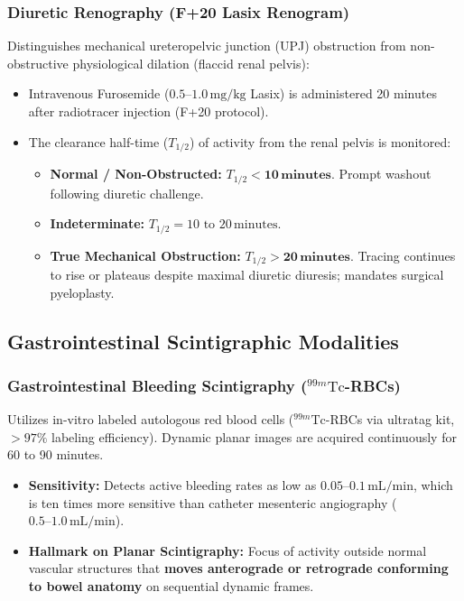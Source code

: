\documentclass[11pt,a4paper]{article}
\begin{document}
\subsubsection{Diuretic Renography (F+20 Lasix Renogram)}
Distinguishes mechanical ureteropelvic junction (UPJ) obstruction from non-obstructive physiological dilation (flaccid renal pelvis):
\begin{itemize}[leftmargin=*]
    \item Intravenous Furosemide ($0.5\text{--}1.0\,\text{mg/kg}$ Lasix) is administered 20 minutes after radiotracer injection (F+20 protocol).
    \item The clearance half-time ($T_{1/2}$) of activity from the renal pelvis is monitored:
    \begin{itemize}
        \item \textbf{Normal / Non-Obstructed:} $T_{1/2} < \mathbf{10\,\text{minutes}}$. Prompt washout following diuretic challenge.
        \item \textbf{Indeterminate:} $T_{1/2} = 10\text{ to }20\,\text{minutes}$.
        \item \textbf{True Mechanical Obstruction:} $T_{1/2} > \mathbf{20\,\text{minutes}}$. Tracing continues to rise or plateaus despite maximal diuretic diuresis; mandates surgical pyeloplasty.
    \end{itemize}
\end{itemize}

\subsection{Gastrointestinal Scintigraphic Modalities}

\subsubsection{Gastrointestinal Bleeding Scintigraphy (\texorpdfstring{$^{99m}\text{Tc}$}{99mTc}-RBCs)}
Utilizes in-vitro labeled autologous red blood cells ($^{99m}\text{Tc}$-RBCs via ultratag kit, $> 97\%$ labeling efficiency). Dynamic planar images are acquired continuously for 60 to 90 minutes.
\begin{itemize}[leftmargin=*]
    \item \textbf{Sensitivity:} Detects active bleeding rates as low as $0.05\text{--}0.1\,\text{mL/min}$, which is ten times more sensitive than catheter mesenteric angiography ($0.5\text{--}1.0\,\text{mL/min}$).
    \item \textbf{Hallmark on Planar Scintigraphy:} Focus of activity outside normal vascular structures that \textbf{moves anterograde or retrograde conforming to bowel anatomy} on sequential dynamic frames.
\end{itemize}
\end{document}
